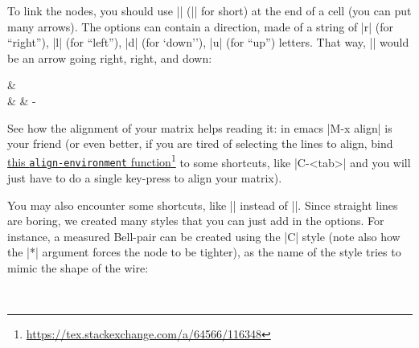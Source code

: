 \documentclass[a4paper,doc2]{ltxdoc} %
\newcommand{\mylink}[2]{\href{#1}{#2}\footnote{\url{#1}}}
\begin{document}
To link the nodes, you should use |\arrow[options]| (|\ar[options]| for short) at the end of a cell (you can put many arrows). The options can contain a direction, made of a string of |r| (for ``right''), |l| (for ``left''), |d| (for `down''), |u| (for ``up'') letters. That way, |\ar[rrd]| would be an arrow going right, right, and down:
\begin{codeexample}[]
\begin{ZX}
  \zxZ{} \ar[rrd] & \zxX{}\\
                  &        & \zxX-{\alpha}
\end{ZX}
\end{codeexample}
See how the alignment of your matrix helps reading it: in emacs |M-x align| is your friend (or even better, if you are tired of selecting the lines to align, bind \mylink{https://tex.stackexchange.com/a/64566/116348}{this \texttt{align-environment} function} to some shortcuts, like |C-<tab>| and you will just have to do a single key-press to align your matrix).

You may also encounter some shortcuts, like |\rar| instead of |\ar[r]|. Since straight lines are boring, we created many styles that you can just add in the options. For instance, a measured Bell-pair can be created using the |C| style (note also how the |*| argument forces the node to be tighter), as the name of the style tries to mimic the shape of the wire:
\begin{codeexample}[]
\begin{ZX}
   \ar[d,C]\\
\end{ZX}
\end{codeexample}

\end{document}
